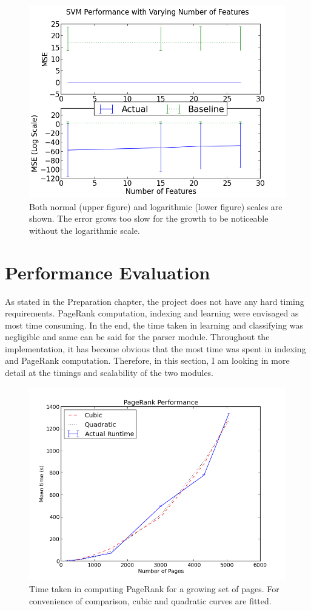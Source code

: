 \documentclass[12pt,a4paper,notitlepage,twoside]{scrbook}
\begin{document}
\begin{figure}[h!]
\centering
  \includegraphics[width=0.8\linewidth]{figs/svm_feats.png}
  \caption{Both normal (upper figure) and logarithmic (lower figure)  scales are shown.
  The error grows too slow for the growth to be noticeable without the logarithmic scale.
  \label{svm_feats}}
\end{figure}



\section{Performance Evaluation}
As stated in the Preparation chapter, the project does not have any hard timing requirements.
PageRank computation, indexing and learning were envisaged as most time consuming. In the
end, the time taken in learning and classifying was negligible and same can be said for
the parser module.
Throughout the implementation, it has become obvious that the most time was spent in
indexing and PageRank computation. Therefore, in this section, I am looking in more detail
at the timings and scalability of the two modules.
\begin{figure}[h!]
  \centering
    \includegraphics[width=0.8\linewidth]{figs/pr.png}
    \caption{Time taken in computing PageRank for a growing set of pages. For convenience
	    of comparison, cubic and quadratic curves are fitted.\label{pr}}
\end{figure}
\end{document}
